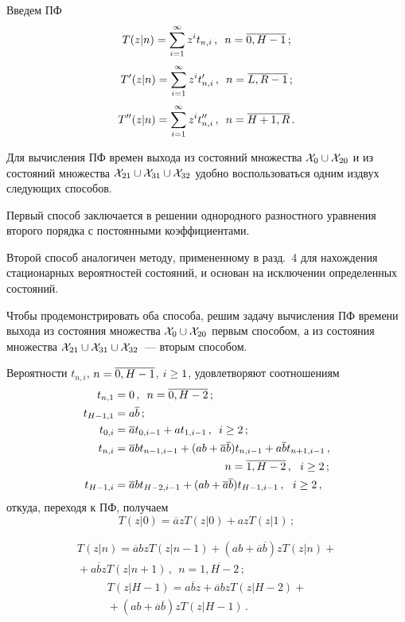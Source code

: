 \begin{multicols}{2}
Введем ПФ
$$
T(z|n) = \sum\limits_{i=1}^{\infty} z^i t_{n,i} \,,\enskip n=\overline{0,H-1}\,;
$$
$$
T'(z|n) = \sum\limits_{i=1}^{\infty} z^i t'_{n,i} \,,\enskip n=\overline{L,R-1}\,;
$$
$$
T''(z|n) = \sum\limits_{i=1}^{\infty} z^i t''_{n,i}\,,\enskip n=\overline{H+1,R}\,.
$$


Для вычисления ПФ времен выхода из состояний
множества ${{\cal X}_0\cup{\cal X}_{20}}$ и
из состояний множества
${{\cal X}_{21}\cup{\cal X}_{31}\cup{\cal X}_{32}}$
удобно воспользоваться одним из\linebreak двух следующих способов.

Первый способ заклю\-чается в решении однородного
разностного уравнения второго порядка с постоянными
коэф\-фициентами.

Второй способ аналогичен методу, примененному в
разд.~4 для нахождения стационарных вероятностей
состояний, и основан на исключении определенных состояний.

Чтобы продемонстрировать оба способа,
решим задачу вычисления ПФ времени выхода из
со\-сто\-яния множества ${{\cal X}_0\cup{\cal X}_{20}}$
первым способом, а из состояния множества
${{\cal X}_{21}\cup{\cal X}_{31}   \cup{\cal X}_{32}}$~--- вторым способом.

Вероятности $t_{n,i}$, $n\hm=\overline{0,H-1}$, $i\hm\ge 1$,
удовлетворяют соотношениям
\begin{align*}
t_{n,1} &= 0 \,,\enskip n=\overline{0,H-2}\,;
\\
t_{H-1,1} &= a \overline{b} \,;
\\
t_{0,i} &= \overline{a}  t_{0,i-1} + a t_{1,i-1} \,,\enskip i\ge 2\,;
\\
t_{n,i} &= \overline{a} b t_{n-1,i-1} + (a b + \overline{a} \overline{b}) t_{n,i-1}
+ a \overline{b} t_{n+1,i-1}\,,\\
&\hspace*{35mm}n=\overline{1,H-2}\,,\ \ i\ge 2\,;
\\
t_{H-1,i} &= \overline{a} b t_{H-2,i-1} + (a b + \overline{a}
\overline{b}) t_{H-1,i-1} \,,\ \ i\ge 2\,,
\end{align*}
откуда, переходя к ПФ, получаем
\begin{equation}
\label{5.2.6}
T(z|0) = \overline{a} z T(z|0) + a z T(z|1)\,;
\end{equation}

\vspace*{-12pt}

\noindent
\begin{multline}
\label{5.2.7}
T(z|n) = \overline{a} b z T(z|n-1) + (a b + \overline{a} \overline{b}) z T(z|n)
+{}\\
{}+ a \overline{b} z T(z|n+1) \,,\ \ n=\overline{1,H-2}\,;
\end{multline}
\begin{multline}
\label{5.2.8}
T(z|H-1) = a \overline{b} z + \overline{a} b z T(z|H-2) + {}\\
{}+
(a b + \overline{a} \overline{b}) z T(z|H-1)\,.
\end{multline}


\end{multicols}
